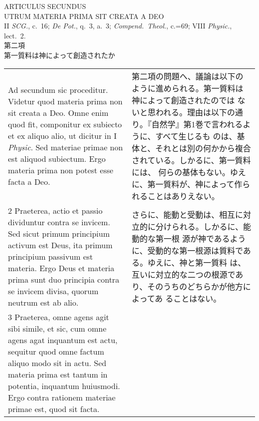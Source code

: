 \documentclass[10pt]{jsarticle} %
\begin{document}
\newpage
{}

\begin{center}
{\Large ARTICULUS SECUNDUS}\\
{\large UTRUM MATERIA PRIMA SIT CREATA A DEO}\\
{\footnotesize II {\itshape SCG.}, c.~16; {\itshape De Pot.}, q.~3,
 a.~3; {\itshape Compend.~Theol.}, c.=69; VIII {\itshape Physic.}, lect.~2.}\\
{\large 第二項\\第一質料は神によって創造されたか}
 
\end{center}


\begin{longtable}{p{21em}p{21em}}

{\sc Ad secundum sic proceditur}. Videtur quod materia prima non sit creata a
Deo. Omne enim quod fit, componitur ex subiecto et ex aliquo alio, ut
dicitur in I {\it Physic}. Sed materiae primae non est aliquod subiectum. Ergo
materia prima non potest esse facta a Deo.

&

第二項の問題へ、議論は以下のように進められる。第一質料は神によって創造されたのでは
ないと思われる。理由は以下の通り。『自然学』第1巻で言われるように、すべて生じるも
のは、基体と、それとは別の何かから複合されている。しかるに、第一質料には、
何らの基体もない。ゆえに、第一質料が、神によって作られることはありえない。


\\

2 {\sc Praeterea}, actio et passio dividuntur contra se invicem. Sed
sicut primum principium activum est Deus, ita primum principium passivum
est materia. Ergo Deus et materia prima sunt duo principia contra se
invicem divisa, quorum neutrum est ab alio.

&

さらに、能動と受動は、相互に対立的に分けられる。しかるに、能動的な第一根
 源が神であるように、受動的な第一根源は質料である。ゆえに、神と第一質料
 は、互いに対立的な二つの根源であり、そのうちのどちらかが他方によってあ
 ることはない。

\\


3 {\sc Praeterea}, omne agens agit sibi simile, et sic, cum omne agens
 agat inquantum est actu, sequitur quod omne factum aliquo modo sit in
 actu. Sed materia prima est tantum in potentia, inquantum
 huiusmodi. Ergo contra rationem materiae primae est, quod sit facta.


\end{longtable}
\end{document}
